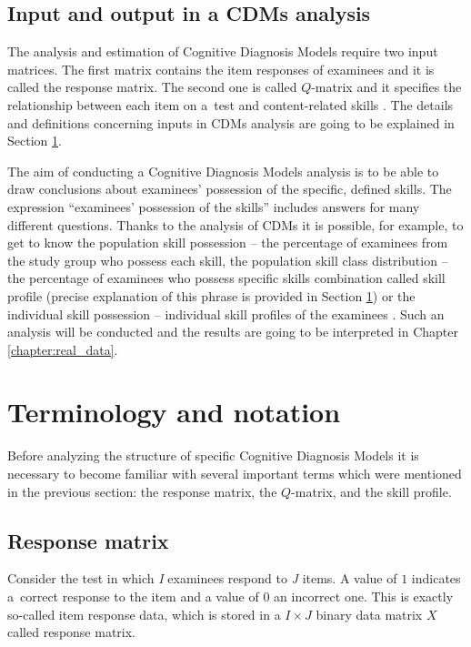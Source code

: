 \documentclass[english]{pwr_wmat_praca_dyplomowa}
\theoremstyle{plain}
\numberwithin{theorem}{chapter}
\theoremstyle{definition}
\numberwithin{theorem}{chapter}
\begin{document}
	\subsection{Input and output in a CDMs analysis}
	
	The analysis and estimation of Cognitive Diagnosis Models require two input matrices. The first matrix contains the item responses of examinees and it is called the response matrix. The second one is called $Q$-matrix and it specifies the relationship between each item on a~test and content-related skills \cite{gdina_in_r}. The details and definitions concerning inputs in CDMs analysis are going to be explained in Section \ref{section:term_notation}. 
	
	\newpage
	The aim of conducting a Cognitive Diagnosis Models analysis is to be able to draw conclusions about examinees’ possession of the specific, defined skills. The expression ``examinees’ possession of the skills'' includes answers for many different questions. Thanks to the analysis of CDMs it is possible, for example, to get to know the population skill possession -- the percentage of examinees from the study group who possess each skill, the population skill class distribution -- the percentage of examinees who possess specific skills combination called skill profile (precise explanation of this phrase is provided in Section \ref{section:term_notation}) or the individual skill possession -- individual skill profiles of the examinees \cite{cdm_in_r}. Such an analysis will be conducted and the results are going to be interpreted in Chapter \ref{chapter:real_data}.
	
	\section{Terminology and notation}\label{section:term_notation}
	
	Before analyzing the structure of specific Cognitive Diagnosis Models it is necessary to become familiar with several important terms which were mentioned in the previous section: the response matrix, the $Q$-matrix, and the skill profile.
	
	\subsection{Response matrix}
	
	Consider the test in which \textit{I} examinees respond to \textit{J} items. A value of $1$ indicates a~correct response to the item and a value of $0$ an incorrect one. This is exactly so-called item response data, which is stored in a $I \times J$ binary data matrix $X$ called response matrix.
	
\end{document}
